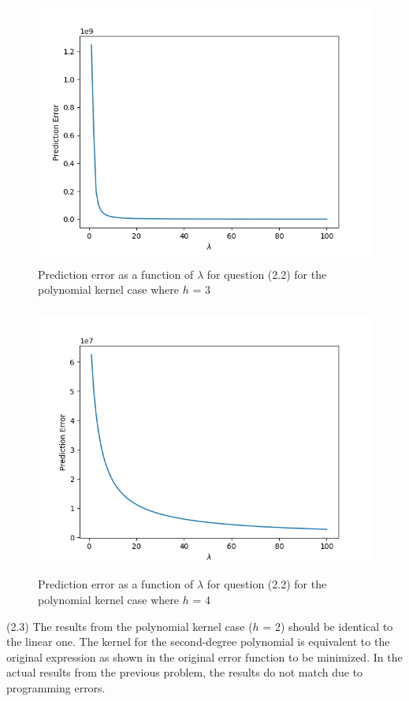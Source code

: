 \begin{figure}[h!]
    \centering
    \includegraphics[height=3.5in]{Figure_8.png}
    \caption{Prediction error as a function of $\lambda$ for question (2.2) for the polynomial kernel case where $h$ = 3}
\end{figure}
\begin{figure}[h!]
    \centering
    \includegraphics[height=3.5in]{Figure_9.png}
    \caption{Prediction error as a function of $\lambda$ for question (2.2) for the polynomial kernel case where $h$ = 4}
\end{figure}
\clearpage

(2.3) The results from the polynomial kernel case ($h$ = 2) should be identical to the linear one. The kernel for the second-degree polynomial is equivalent to the original expression as shown in the original error function to be minimized. In the actual results from the previous problem, the results do not match due to programming errors.